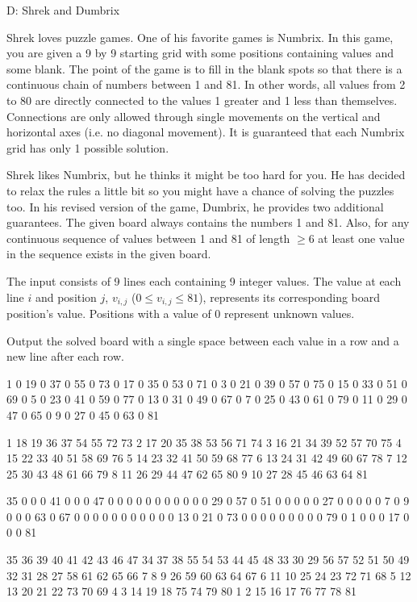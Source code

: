 \begin{problem}{D: Shrek and Dumbrix} 

Shrek loves puzzle games. One of his favorite games is Numbrix. In this game, you are given a 9 by 9 starting grid with some positions containing values and some blank. The point of the game is to fill in the blank spots so that there is a continuous chain of numbers between 1 and 81. In other words, all values from 2 to 80 are directly connected to the values 1 greater and 1 less than themselves. Connections are only allowed through single movements on the vertical and horizontal axes (i.e. no diagonal movement). It is guaranteed that each Numbrix grid has only 1 possible solution.

Shrek likes Numbrix, but he thinks it might be too hard for you. He has decided to relax the rules a little bit so you might have a chance of solving the puzzles too. In his revised version of the game, Dumbrix, he provides two additional guarantees. The given board always contains the numbers 1 and 81. Also, for any continuous sequence of values between 1 and 81 of length $\geq 6$ at least one value in the sequence exists in the given board.

\begin{formalin}
The input consists of 9 lines each containing 9 integer values. The value at each line $i$ and position $j$, $v_{i,j}$ ($0 \leq v_{i,j} \leq 81$), represents its corresponding board position's value. Positions with a value of 0 represent unknown values.
\end{formalin}

\begin{formalout}
Output the solved board with a single space between each value in a row and a new line after each row.
\end{formalout}

\begin{datain}
1 0 19 0 37 0 55 0 73
0 17 0 35 0 53 0 71 0
3 0 21 0 39 0 57 0 75
0 15 0 33 0 51 0 69 0
5 0 23 0 41 0 59 0 77
0 13 0 31 0 49 0 67 0
7 0 25 0 43 0 61 0 79
0 11 0 29 0 47 0 65 0
9 0 27 0 45 0 63 0 81
\end{datain}

\begin{dataout}
1 18 19 36 37 54 55 72 73
2 17 20 35 38 53 56 71 74
3 16 21 34 39 52 57 70 75
4 15 22 33 40 51 58 69 76
5 14 23 32 41 50 59 68 77
6 13 24 31 42 49 60 67 78
7 12 25 30 43 48 61 66 79
8 11 26 29 44 47 62 65 80
9 10 27 28 45 46 63 64 81
\end{dataout}

\begin{datain}
35 0 0 0 41 0 0 0 47
0 0 0 0 0 0 0 0 0
0 0 29 0 57 0 51 0 0
0 0 0 27 0 0 0 0 0
7 0 9 0 0 0 63 0 67
0 0 0 0 0 0 0 0 0
0 0 13 0 21 0 73 0 0
0 0 0 0 0 0 0 79 0
1 0 0 0 17 0 0 0 81
\end{datain}

\begin{dataout}
35 36 39 40 41 42 43 46 47
34 37 38 55 54 53 44 45 48
33 30 29 56 57 52 51 50 49
32 31 28 27 58 61 62 65 66
7 8 9 26 59 60 63 64 67
6 11 10 25 24 23 72 71 68
5 12 13 20 21 22 73 70 69
4 3 14 19 18 75 74 79 80
1 2 15 16 17 76 77 78 81
\end{dataout}

\end{problem}